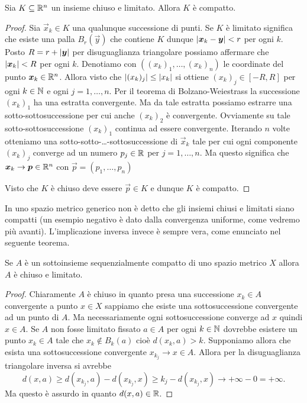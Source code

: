 \begin{theorem}[compattezza in $\RR^n$]%
  \label{th:compattezza_Rn}%
Sia $K\subseteq {\mathbb R}^n$ un insieme chiuso e limitato. 
Allora $K$ è compatto.
\end{theorem}
\begin{proof}
Sia $\vec x_k\in K$ una qualunque successione di punti. 
Se $K$ è limitato significa che esiste una palla $B_r(\vec y)$ 
che contiene $K$ dunque ${\left|\boldsymbol x_k - \boldsymbol y\right|} < r$ per ogni $k$.
Posto $R=r+{\left|\boldsymbol y\right|}$ per disuguaglianza triangolare possiamo affermare 
che ${\left|\boldsymbol x_k\right|} < R$ per ogni $k$. 
Denotiamo con $((x_k)_1, \dots, (x_k)_n)$ le coordinate 
del punto $\boldsymbol x_k\in {\mathbb R}^n$. 
Allora visto che ${\left|(x_k)_j\right|}\le {\left|x_k\right|}$ si ottiene $(x_k)_j\in [-R,R]$
per ogni $k\in{\mathbb N}$ e ogni $j=1,\dots, n$.
Per il teorema di Bolzano-Weiestrass la successione $(x_k)_1$ ha una estratta 
convergente. Ma da tale estratta possiamo estrarre una sotto-sottosuccessione 
per cui anche $(x_k)_2$ è convergente. 
Ovviamente su tale sotto-sottosuccessione $(x_k)_1$ continua ad essere convergente.
Iterando $n$ volte otteniamo una sotto-sotto-\dots-sottosuccessione di $\vec x_k$ 
tale per cui ogni componente $(x_k)_j$ converge ad un numero $p_j\in {\mathbb R}$
per $j=1,\dots, n$.
Ma questo significa che $\boldsymbol x_k \to \boldsymbol p \in {\mathbb R}^n$ con $\vec p = (p_1,\dots, p_n)$

Visto che $K$ è chiuso deve essere $\vec p\in K$ e dunque $K$ è compatto.
\end{proof}

In uno spazio metrico generico non è detto che gli insiemi chiusi e limitati 
siano compatti (un esempio negativo è dato dalla convergenza uniforme, come
vedremo più avanti). 
L'implicazione inversa invece è sempre vera, come enunciato nel
seguente teorema.

\begin{theorem}%
\mymark{**}%
Se $A$ è un sottoinsieme sequenzialmente
compatto di uno spazio metrico $X$
allora $A$ è chiuso e limitato.
\end{theorem}
%
\begin{proof}
Chiaramente $A$ è chiuso in quanto presa una successione $x_k\in A$ convergente a punto $x\in X$
sappiamo che esiste una sottosuccessione convergente ad un punto di $A$. Ma necessariamente ogni sottosuccessione converge ad $x$ quindi $x\in A$. Se $A$ non fosse limitato
fissato $a\in A$ per ogni $k\in {\mathbb N}$ dovrebbe esistere un punto $x_k\in A$ tale che $x_k \not\in B_k(a)$
cioè $d(x_k,a) > k$. Supponiamo allora che esista una sottosuccessione convergente $x_{k_j}\to x \in A$. Allora per la disuguaglianza triangolare inversa si avrebbe
\[
  d(x, a) \ge d(x_{k_j}, a) - d(x_{k_j},x)
   \ge k_j - d(x_{k_j},x) \to +\infty - 0 = +\infty.
\]
Ma questo è assurdo in quanto $d(x,a)\in {\mathbb R}$.
\end{proof}


